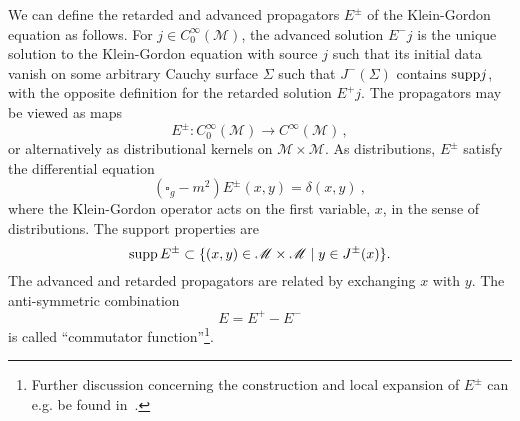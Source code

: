 \documentclass[12pt]{article}
\newcommand{\M}{\mathscr{M}}
\theoremstyle{plain}
\theoremstyle{definition}
\def\ben{\begin{equation}}
\def\een{\end{equation}}
\begin{document}
We can define the retarded and advanced
propagators $E^\pm$ of the Klein-Gordon equation as follows. For $j \in C_0^\infty(\M)$,
the advanced solution $E^- j$ is the unique solution to the Klein-Gordon equation
with source $j$ such that its initial data vanish on some arbitrary
Cauchy surface $\Sigma$ such that $J^-(\Sigma)$ contains ${\rm supp} j$,
with the opposite definition for the retarded solution $E^+ j$.
The propagators may be viewed as maps
\ben
E^\pm: C^\infty_0(\M) \to C^\infty(\M) \, ,
\een
or alternatively as distributional kernels on $\M \times \M$.
As distributions, $E^\pm$ satisfy the differential equation
\ben\label{propeq}
(\square_g - m^2)E^\pm (x,y) = \delta(x,y) \ ,
\een
where the Klein-Gordon operator acts on the first variable, $x$, in
the sense of distributions.
The support properties are
\ben
{\rm supp} \, E^\pm \subset \{(x,y) \in \M \times \M \mid
y \in J^\pm(x) \}.
\een
The advanced and
retarded propagators are related by exchanging $x$ with $y$.
The anti-symmetric combination
\ben\label{Edef}
E = E^+ - E^-
\een
is called ``commutator function''\footnote{Further discussion concerning the construction and local expansion of $E^\pm$ can e.g.
be found in~\cite{bar}.}.
\end{document}
